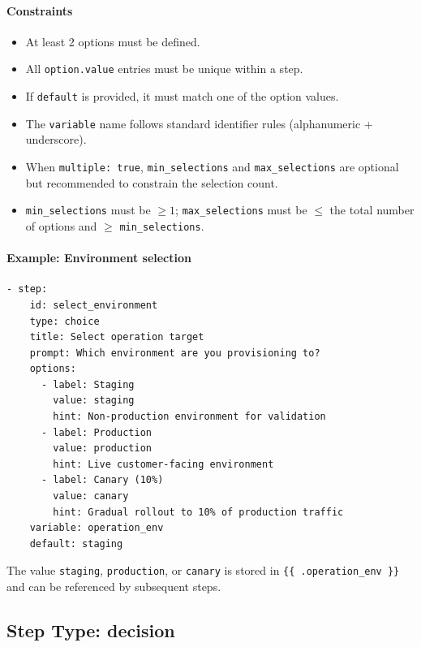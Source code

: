 \paragraph{Constraints}

\begin{itemize}
  \item At least 2 options must be defined.
  \item All \texttt{option.value} entries must be unique within a step.
  \item If \texttt{default} is provided, it must match one of the option values.
  \item The \texttt{variable} name follows standard identifier rules (alphanumeric + underscore).
  \item When \texttt{multiple: true}, \texttt{min\_selections} and \texttt{max\_selections}
        are optional but recommended to constrain the selection count.
  \item \texttt{min\_selections} must be $\geq 1$; \texttt{max\_selections} must be
        $\leq$ the total number of options and $\geq$ \texttt{min\_selections}.
\end{itemize}

\paragraph{Example: Environment selection}

\begin{verbatim}
- step:
    id: select_environment
    type: choice
    title: Select operation target
    prompt: Which environment are you provisioning to?
    options:
      - label: Staging
        value: staging
        hint: Non-production environment for validation
      - label: Production
        value: production
        hint: Live customer-facing environment
      - label: Canary (10%)
        value: canary
        hint: Gradual rollout to 10% of production traffic
    variable: operation_env
    default: staging
\end{verbatim}

The value \texttt{staging}, \texttt{production}, or \texttt{canary} is stored in
\texttt{\{\{ .operation\_env \}\}} and can be referenced by subsequent steps.

\subsection{Step Type: decision}
\label{subsec:step-decision}

